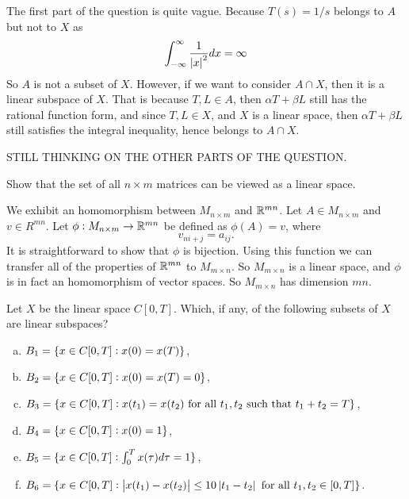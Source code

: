 \begin{solution}
	The first part of the question is quite vague. Because $ T(s) = 1/s $ belongs to $ A $ but not to $ X $ as
	\[ \int_{-\infty}^{\infty} \frac{1}{\left|x\right|^2} dx = \infty \]
	So $ A $ is not a subset of $ X $. However, if we want to consider $ A\cap X $, then it is a linear subspace of $ X $. That is because $ T, L \in A $, then $ \alpha T + \beta L $ still has the rational function form, and since $ T,L \in X $, and $ X $ is a linear space, then $ \alpha T + \beta L $ still satisfies the integral inequality, hence belongs to $ A\cap X $.
	
	STILL THINKING ON THE OTHER PARTS OF THE QUESTION.
\end{solution}


\begin{problem}
	Show that the set of all $ n\times m $ matrices can be viewed as a linear space.
\end{problem}
\begin{solution}
	We exhibit an homomorphism between $ M_{n\times m} $ and $ \mathbb{R}^{mn} $. Let $ A \in M_{n\times m} $ and $ v \in R^{mn} $. Let $ \phi: M_{n\times m} \to \mathbb{R}^{mn} $ be defined as $ \phi(A) = v $, where
	\[ v_{ni+j} = a_{ij}. \]
	It is straightforward to show that $ \phi $ is bijection. Using this function we can transfer all of the properties of  $ \mathbb{R}^{mn} $ to $ M_{m\times n} $. So $ M_{m\times n} $ is a linear space, and $ \phi $ is in fact an homomorphism of vector spaces. So $ M_{m\times n} $ has dimension $ mn $.
\end{solution}



\begin{problem}
	Let $ X $ be the linear space $ C[0,T] $. Which, if any, of the following subsets of $ X $ are linear subspaces?
	\begin{enumerate}[(a)]
		\item $ B_1 = \{x\in C[0,T]: x(0) = x(T)\} $,
		\item $ B_2 = \{x\in C[0,T]: x(0) = x(T) = 0\} $,
		\item $ B_3 = \{x\in C[0,T]: x(t_1)=x(t_2) \text{ for all $ t_1,t_2 $ such that $ t_1+t_2 = T $}\} $,
		\item $ B_4 = \{x\in C[0,T]: x(0) = 1\} $,
		\item $ B_5 = \{x\in C[0,T]: \int_{0}^{T} x(\tau) d\tau = 1 \} $,
		\item $ B_6 = \{x\in C[0,T]: \left|x(t_1)-x(t_2)\right|\leq 10\left|t_1-t_2\right| \text{ for all $ t_1,t_2\in [0,T] $}\} $.
	\end{enumerate}
\end{problem}

